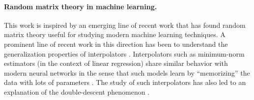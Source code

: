 
\paragraph{Random matrix theory in machine learning.}
This work is inspired by an emerging line of recent work that has found random matrix theory useful for studying modern machine learning techniques.
A prominent line of recent work in this direction has been to understand the generalization properties of interpolators \cite{bartlett2020benign,hastie2019surprises,montanari2019generalization,liang2020just,liang2020precise}.
Interpolators such as minimum-norm estimators (in the context of linear regression) share similar behavior with modern neural networks in the sense that such models learn by ``memorizing'' the data with lots of parameters \cite{mei2019generalization}.
The study of such interpolators has also led to an explanation of the double-descent phenomenon \cite{belkin2019reconciling}.


